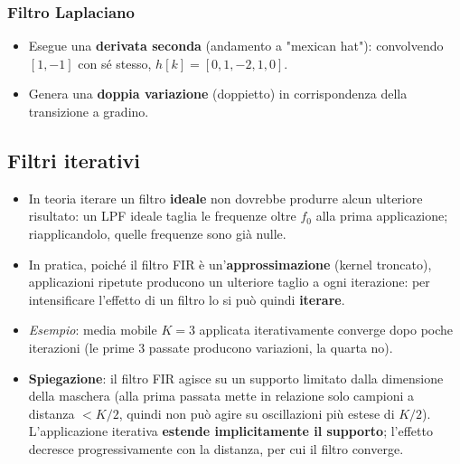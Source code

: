 \documentclass[12pt, a4paper]{article}
\begin{document}
\subsubsection{Filtro Laplaciano}
\begin{itemize}
    \item Esegue una \textbf{derivata seconda} (andamento a "mexican hat"): convolvendo $[1,-1]$ con sé stesso, $h[k]=[0,1,-2,1,0]$.
    \item Genera una \textbf{doppia variazione} (doppietto) in corrispondenza della transizione a gradino.
\end{itemize}

\subsection{Filtri iterativi}
\begin{itemize}
    \item In teoria iterare un filtro \textbf{ideale} non dovrebbe produrre alcun ulteriore risultato: un LPF ideale taglia le frequenze oltre $f_0$ alla prima applicazione; riapplicandolo, quelle frequenze sono già nulle.
    \item In pratica, poiché il filtro FIR è un'\textbf{approssimazione} (kernel troncato), applicazioni ripetute producono un ulteriore taglio a ogni iterazione: per intensificare l'effetto di un filtro lo si può quindi \textbf{iterare}.
    \item \textit{Esempio}: media mobile $K=3$ applicata iterativamente converge dopo poche iterazioni (le prime 3 passate producono variazioni, la quarta no).
    \item \textbf{Spiegazione}: il filtro FIR agisce su un supporto limitato dalla dimensione della maschera (alla prima passata mette in relazione solo campioni a distanza $<K/2$, quindi non può agire su oscillazioni più estese di $K/2$). L'applicazione iterativa \textbf{estende implicitamente il supporto}; l'effetto decresce progressivamente con la distanza, per cui il filtro converge.
\end{itemize}
\end{document}
